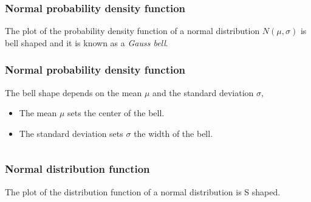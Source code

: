 \begin{frame}
\frametitle{Normal probability density function}
The plot of the probability density function of a normal distribution $N(\mu,\sigma)$ is bell shaped and it is known as a \emph{Gauss bell}.
\begin{center}
\end{center}
\end{frame}


\begin{frame}
\frametitle{Normal probability density function}
The bell shape depends on the mean $\mu$ and the standard deviation $\sigma$,
\begin{itemize}
\item The mean $\mu$ sets the center of the bell.
\item The standard deviation sets $\sigma$ the width of the bell.
\end{itemize}
\medskip
\begin{columns}
\begin{column}{0.47\textwidth}

\end{column}
\begin{column}{0.47\textwidth}
\end{column}
\end{columns}
\end{frame}


\begin{frame}
\frametitle{Normal distribution function}
The plot of the distribution function of a normal distribution is S shaped. 
\begin{center}
\end{center}
\end{frame}


